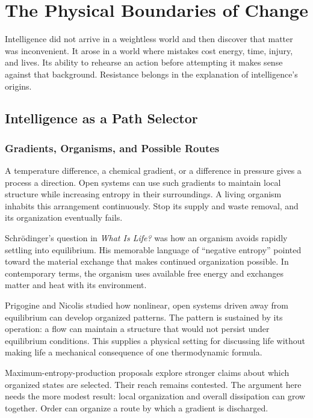 \chapter{The Physical Boundaries of Change}

Intelligence did not arrive in a weightless world and then discover that matter was inconvenient. It arose in a world where mistakes cost energy, time, injury, and lives. Its ability to rehearse an action before attempting it makes sense against that background. Resistance belongs in the explanation of intelligence's origins.

\section{Intelligence as a Path Selector}

\subsection{Gradients, Organisms, and Possible Routes}


A temperature difference, a chemical gradient, or a difference in pressure gives a process a direction. Open systems can use such gradients to maintain local structure while increasing entropy in their surroundings. A living organism inhabits this arrangement continuously. Stop its supply and waste removal, and its organization eventually fails.

Schrödinger's question in \emph{What Is Life?} was how an organism avoids rapidly settling into equilibrium. His memorable language of “negative entropy” pointed toward the material exchange that makes continued organization possible.\cite{schrodinger1944} In contemporary terms, the organism uses available free energy and exchanges matter and heat with its environment.

Prigogine and Nicolis studied how nonlinear, open systems driven away from equilibrium can develop organized patterns.\cite{prigogine1977nobel,nicolis1977} The pattern is sustained by its operation: a flow can maintain a structure that would not persist under equilibrium conditions. This supplies a physical setting for discussing life without making life a mechanical consequence of one thermodynamic formula.

Maximum-entropy-production proposals explore stronger claims about which organized states are selected. Their reach remains contested.\cite{martyushev2006,bruers2007} The argument here needs the more modest result: local organization and overall dissipation can grow together. Order can organize a route by which a gradient is discharged.

